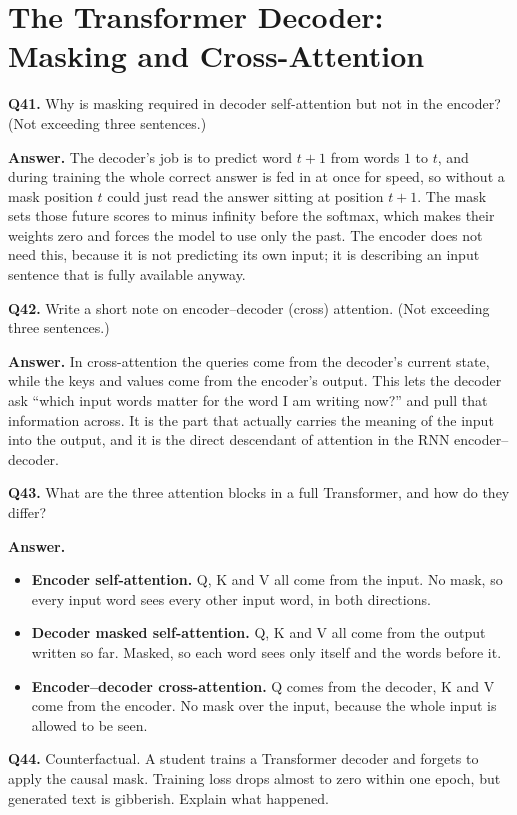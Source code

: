 \documentclass[11pt]{article}
\begin{document}
\section{The Transformer Decoder: Masking and Cross-Attention}

\textbf{Q41.} Why is masking required in decoder self-attention but not in the encoder? (Not
exceeding three sentences.)

\textbf{Answer.} The decoder's job is to predict word $t+1$ from words $1$ to $t$, and during
training the whole correct answer is fed in at once for speed, so without a mask position $t$
could just read the answer sitting at position $t+1$. The mask sets those future scores to
minus infinity before the softmax, which makes their weights zero and forces the model to use
only the past. The encoder does not need this, because it is not predicting its own input; it
is describing an input sentence that is fully available anyway.

\medskip
\textbf{Q42.} Write a short note on encoder--decoder (cross) attention. (Not exceeding three
sentences.)

\textbf{Answer.} In cross-attention the queries come from the decoder's current state, while
the keys and values come from the encoder's output. This lets the decoder ask ``which input
words matter for the word I am writing now?'' and pull that information across. It is the part
that actually carries the meaning of the input into the output, and it is the direct
descendant of attention in the RNN encoder--decoder.

\medskip
\textbf{Q43.} What are the three attention blocks in a full Transformer, and how do they
differ?

\textbf{Answer.}
\begin{itemize}
  \item \textbf{Encoder self-attention.} Q, K and V all come from the input. No mask, so every input word sees every other input word, in both directions.
  \item \textbf{Decoder masked self-attention.} Q, K and V all come from the output written so far. Masked, so each word sees only itself and the words before it.
  \item \textbf{Encoder--decoder cross-attention.} Q comes from the decoder, K and V come from the encoder. No mask over the input, because the whole input is allowed to be seen.
\end{itemize}

\medskip
\textbf{Q44.} Counterfactual. A student trains a Transformer decoder and forgets to apply the
causal mask. Training loss drops almost to zero within one epoch, but generated text is
gibberish. Explain what happened.
\end{document}
